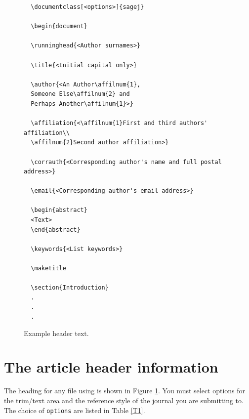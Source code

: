 \documentclass[Afour,sageh,times]{includes/tex/sagej}
\begin{document}
\begin{figure}
  \setlength{\fboxsep}{0pt}%
  \setlength{\fboxrule}{0pt}%
  \begin{center}
  \begin{verbatim}
  \documentclass[<options>]{sagej}

  \begin{document}

  \runninghead{<Author surnames>}

  \title{<Initial capital only>}

  \author{<An Author\affilnum{1},
  Someone Else\affilnum{2} and
  Perhaps Another\affilnum{1}>}

  \affiliation{<\affilnum{1}First and third authors' affiliation\\
  \affilnum{2}Second author affiliation>}

  \corrauth{<Corresponding author's name and full postal address>}

  \email{<Corresponding author's email address>}

  \begin{abstract}
  <Text>
  \end{abstract}

  \keywords{<List keywords>}

  \maketitle

  \section{Introduction}
  .
  .
  .
  \end{verbatim}
  \end{center}
  \caption{Example header text.\label{F1}}
\end{figure}

\section{The article header information}

The heading for any file using \textsf{\journalclass} is shown in Figure
\ref{F1}. You must select options for the trim/text area and the
reference style of the journal you are submitting to. The choice of
\verb+options+ are listed in Table \ref{T1}.
\end{document}
